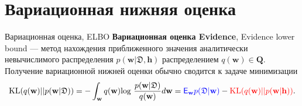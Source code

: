 \documentclass[usenames,dvipsnames,10pt,pdf,utf8,russian,aspectratio=43]{beamer}
\begin{document}
\section{Вариационная нижняя оценка}
\begin{frame}{Вариационная оценка, ELBO}
\textbf{Вариационная оценка Evidence}, Evidence lower bound --- метод нахождения приближенного значения аналитически невычислимого распределения $p(\mathbf{w}|\mathfrak{D}, \mathbf{h})$ распределением $q(\mathbf{w}) \in \mathbf{Q}$. Получение вариационной нижней оценки обычно сводится к задаче минимизации
$$\text{KL}(q(\mathbf{w})||p(\mathbf{w}| \mathfrak{D}))=
-\int_{\mathbf{w}} q(\mathbf{w}) \text{log}~\frac{p(\mathbf{w}| \mathfrak{D})} {q(\mathbf{w})}d\mathbf{w} = \textcolor{blue}{\mathsf{E}_{\mathbf{w}} p(\mathfrak{D}|\mathbf{w})} - \textcolor{red}{\text{KL}(q(\mathbf{w})||p(\mathbf{w}| \mathbf{h}))}.
$$

\begin{figure}
  \centering
\label{fig:1}\qquad

\end{figure}

\end{frame}
\end{document}
